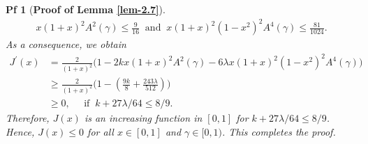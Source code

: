 \documentclass[10pt,a4paper]{amsart}
\newtheorem{pf}{Pf}
\begin{document}
\begin{pf}[\bf Proof of Lemma \ref{lem-2.7}]
\begin{align*}
		x(1+x)^2A^2(\gamma)\leq \frac{9}{16}\;\;\text{and}\;\; x(1+x)^2(1-x^2)^2A^4(\gamma)\leq \frac{81}{1024}.
	\end{align*}
	As a consequence, we obtain
	\begin{align*}
		J^{\prime}(x)&=\frac{2}{(1+x)^2}\bigg(1-2kx(1+x)^2A^2(\gamma)-6\lambda x(1+x)^2(1-x^2)^2A^4(\gamma)\bigg)\\&\geq  \frac{2}{(1+x)^2}\bigg(1-\left(\frac{9k}{8}+\frac{243\lambda}{512}\right)\bigg)\\&\geq 0,\;\;\;\;\; \text{if}\;\; k+27\lambda/64\leq 8/9.
	\end{align*}
	Therefore, $ J(x) $ is an increasing function in $ [0,1] $ for $ k+27\lambda/64\leq 8/9 $. Hence, $ J(x)\leq 0 $ for all $ x\in [0,1] $ and $ \gamma\in [0,1) $. This completes the proof.
\end{pf}
\end{document}
